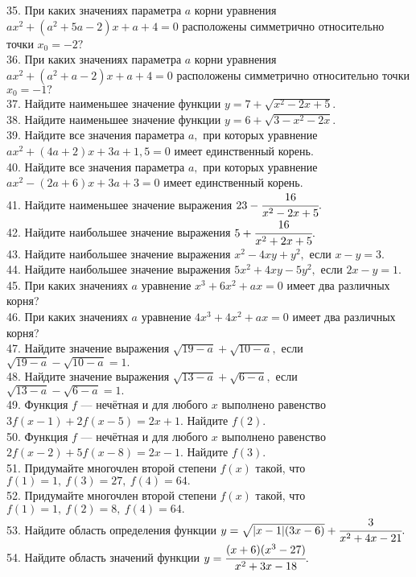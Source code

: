 35. При каких значениях параметра $a$ корни уравнения $ax^2+(a^2+5a-2)x+a+4=0$ расположены симметрично относительно точки $x_0=-2?$\\
36. При каких значениях параметра $a$ корни уравнения $ax^2+(a^2+a-2)x+a+4=0$ расположены симметрично относительно точки $x_0=-1?$\\
37. Найдите наименьшее значение функции $y=7+\sqrt{x^2-2x+5}.$\\
38. Найдите наименьшее значение функции $y=6+\sqrt{3-x^2-2x}.$\\
39. Найдите все значения параметра $a,$ при которых уравнение $ax^2+(4a+2)x+3a+1,5=0$ имеет единственный корень.\\
40. Найдите все значения параметра $a,$ при которых уравнение $ax^2-(2a+6)x+3a+3=0$ имеет единственный корень.\\
41. Найдите наименьшее значение выражения $23-\cfrac{16}{x^2-2x+5}.$\\
42. Найдите наибольшее значение выражения $5+\cfrac{16}{x^2+2x+5}.$\\
43. Найдите наибольшее значение выражения $x^2-4xy+y^2,$ если $x-y=3.$\\
44. Найдите наибольшее значение выражения $5x^2+4xy-5y^2,$ если $2x-y=1.$\\
45. При каких значениях $a$ уравнение $x^3+6x^2+ax=0$ имеет два различных корня?\\
46. При каких значениях $a$ уравнение $4x^3+4x^2+ax=0$ имеет два различных корня?\\
47. Найдите значение выражения $\sqrt{19-a}+\sqrt{10-a},$ если $\sqrt{19-a}-\sqrt{10-a}=1.$\\
48. Найдите значение выражения $\sqrt{13-a}+\sqrt{6-a},$ если $\sqrt{13-a}-\sqrt{6-a}=1.$\\
49. Функция $f$ --- нечётная и для любого $x$ выполнено равенство $3f(x-1)+2f(x-5)=2x+1.$ Найдите $f(2).$\\
50. Функция $f$ --- нечётная и для любого $x$ выполнено равенство $2f(x-2)+5f(x-8)=2x-1.$ Найдите $f(3).$\\
51. Придумайте многочлен второй степени $f(x)$ такой, что $f(1)=1,\ f(3)=27,\ f(4)=64.$\\
52. Придумайте многочлен второй степени $f(x)$ такой, что $f(1)=1,\ f(2)=8,\ f(4)=64.$\\
53. Найдите область определения функции $y=\sqrt{|x-1|(3x-6)}+\cfrac{3}{x^2+4x-21}.$\\
54. Найдите область значений функции $y=\cfrac{(x+6)(x^3-27)}{x^2+3x-18}.$\\
